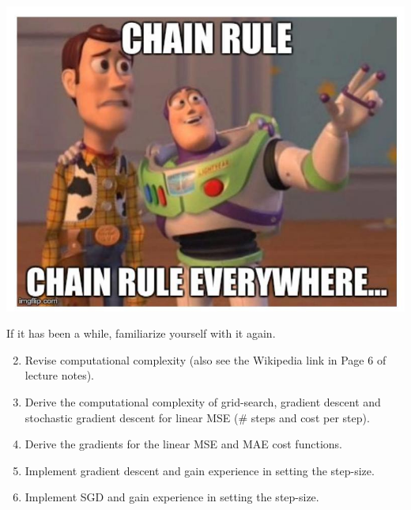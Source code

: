 \documentclass[10pt]{article}
\begin{document}
\begin{center}
\includegraphics[max width=\textwidth]{2023_12_30_4ff132a3450066e65b4fg-24(1)}
\end{center}

If it has been a while, familiarize yourself with it again.

\begin{enumerate}
  \setcounter{enumi}{1}
  \item Revise computational complexity (also see the Wikipedia link in Page 6 of lecture notes).

  \item Derive the computational complexity of grid-search, gradient descent and stochastic gradient descent for linear MSE (\# steps and cost per step).

  \item Derive the gradients for the linear MSE and MAE cost functions.

  \item Implement gradient descent and gain experience in setting the step-size.

  \item Implement SGD and gain experience in setting the step-size.

\end{enumerate}
\end{document}
